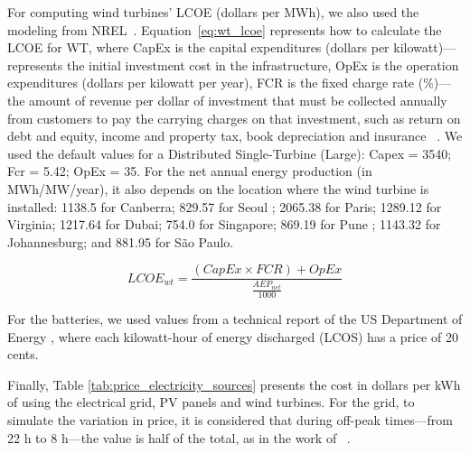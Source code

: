 For computing wind turbines' LCOE (dollars per MWh), we also used the modeling from NREL~\cite{nrel_wt_costs_2021}. Equation~\eqref{eq:wt_lcoe} represents how to calculate the LCOE for WT, where CapEx is the capital expenditures (dollars per kilowatt)---represents the initial investment cost in the infrastructure, OpEx is the operation expenditures (dollars per kilowatt per year), FCR is the fixed charge rate (\%)---the amount of revenue per dollar of investment that must be collected annually from customers to pay the carrying charges on that investment, such as return on debt and equity, income and property tax, book depreciation and insurance ~\cite{nrel_economic_wt_1995}. We used the default values for a Distributed Single-Turbine (Large): Capex = 3540; Fcr = 5.42; OpEx = 35. For the net annual energy production (in MWh/MW/year), it also depends on the location where the wind turbine is installed:  1138.5 for Canberra; 829.57 for Seoul ;  2065.38 for Paris; 1289.12 for Virginia;  1217.64 for Dubai;   754.0 for Singapore;  869.19 for Pune ;  1143.32 for Johannesburg; and  881.95 for São Paulo.
  
\begin{equation} \label{eq:wt_lcoe}
  LCOE_{wt} = \frac{ (CapEx \times FCR) + OpEx}{ \frac{AEP_{net}}{1000}   }
\end{equation}

For the batteries, we used values from a technical report of the US Department of Energy \cite{battery_lcos_2022}, where each kilowatt-hour of energy discharged (LCOS) has a price of 20 cents.

Finally, Table \ref{tab:price_electricity_sources} presents the cost in dollars per kWh of using the electrical grid, PV panels and wind turbines. For the grid, to simulate the variation in price, it is considered that during off-peak times---from 22 h to 8 h---the value is half of the total, as in the work of ~\citet{KHODAYARSERESHT2023_energycarbonaware_vm}.

